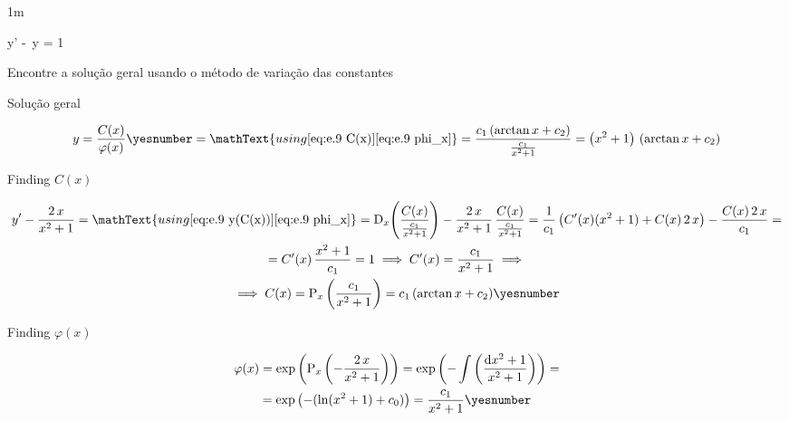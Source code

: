 \documentclass["AM3C-Slides_annotations.tex"]{subfiles}
\begin{document}
\begin{exampleBox}1m{} %

  \begin{BM}
    y' - \,y = 1
  \end{BM}
  Encontre a solução geral usando o método de variação das constantes
  
  \answer{}

  Solução geral
  \begin{tcolorbox}
    \begin{gather*}
      y
      = \frac{C(x)}{\varphi(x)}
      \yesnumber\label{eq:e.9 y(C(x))}
      = \mathText{using
        \eqref{eq:e.9 C(x)}
        \eqref{eq:e.9 phi_x}
      }
      = \frac{
        c_1\,(
          \arctan{x}+c_2
        )    
      }{
        \frac{c_1}{x^2+1}
      }
      = \left(x^2+1\right)
      \,\left(
        \arctan{x}
        + c_2
      \right)
    \end{gather*}
  \end{tcolorbox}

  Finding \(C(x)\)
  \begin{tcolorbox}
    \begin{gather*}
      y'-\frac{2\,x}{x^2+1}
      = \mathText{using 
        \eqref{eq:e.9 y(C(x))}
        \eqref{eq:e.9 phi_x}
      }
      = \mdif{x}{\left(
          \frac{C(x)}{\frac{c_1}{x^2+1}}
      \right)}
      - \frac{2\,x}{x^2+1}
      \,\frac{C(x)}{\frac{c_1}{x^2+1}}
      = \frac{1}{c_1}\left(
        C'(x)
        (x^2+1)
        + C(x)\,2\,x
      \right)
      - \frac{C(x)\,2\,x}{c_1}
      = \\
      = C'(x)\,\frac{x^2+1}{c_1}
      = 1
      \implies
      C'(x) 
      = \frac{c_1}{x^2+1}
      \implies \\
      \implies
      C(x)
      = \prim_x{\left(
          \frac{c_1}{x^2+1}
      \right)}
      = c_1\,(
        \arctan{x}+c_2
      )    
      \yesnumber\label{eq:e.9 C(x)}
    \end{gather*}
  \end{tcolorbox}
  
  Finding \(\varphi(x)\)
  \begin{tcolorbox}
    \begin{gather*}
      \varphi(x)
      = \exp{\left(
          \prim_x{\left(
              -\frac{2\,x}{x^2+1}
          \right)}
      \right)}
      = \exp{\left(
          -\int{\left(
              \frac{\odif{x^2+1}}{x^2+1}
          \right)}
      \right)}
      = \\
      = \exp{\left(
          -(
            \ln(x^2+1)+c_0
          )
      \right)}
      = 
      \frac{c_1}{x^2+1}
      \yesnumber\label{eq:e.9 phi_x}
    \end{gather*}
  \end{tcolorbox}

\end{exampleBox}
\end{document}
